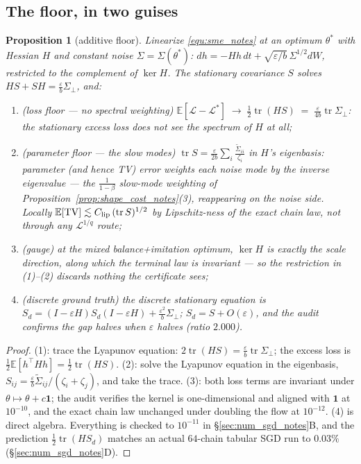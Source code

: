 \documentclass[11pt]{article}
\newtheorem{proposition}[theorem]{Proposition}
\theoremstyle{definition}
\theoremstyle{remark}
\begin{document}
\subsection{The floor, in two guises}\label{sec:floor_notes}

\begin{proposition}[additive floor]\label{prop:additive_floor_notes}
Linearize \eqref{equ:sme_notes} at an optimum $\theta^*$ with Hessian $H$ and constant noise
$\Sigma = \Sigma(\theta^*)$: $dh = -Hh\,dt + \sqrt{\varepsilon/b}\,\Sigma^{1/2}dW$,
restricted to the complement of $\ker H$. The stationary covariance $S$ solves
$HS+SH = \tfrac{\varepsilon}{b}\Sigma_\perp$, and:
\begin{enumerate}
    \item \emph{(loss floor --- no spectral weighting)}\;
    $\mathbb E[\mathcal L-\mathcal L^*] \;\to\; \tfrac12\operatorname{tr}(HS)
    \;=\; \frac{\varepsilon}{4b}\operatorname{tr}\Sigma_\perp$: the stationary excess
    loss does not see the spectrum of $H$ at all;
    \item \emph{(parameter floor --- the slow modes)}\;
    $\operatorname{tr} S = \frac{\varepsilon}{2b}\sum_i
    \frac{\widetilde\Sigma_{ii}}{\zeta_i}$ in $H$'s eigenbasis: parameter (and hence
    TV) error weights each noise mode by the \emph{inverse} eigenvalue --- the
    $\frac1{1-\beta}$ slow-mode weighting of Proposition~\ref{prop:shape_cost_notes}(3),
    reappearing on the noise side. Locally
    $\mathbb E[\mathrm{TV}] \lesssim C_{\mathrm{lip}}\,(\operatorname{tr}S)^{1/2}$ by
    Lipschitz-ness of the exact chain law, not through any $\mathcal L^{1/q}$ route;
    \item \emph{(gauge)} at the mixed balance+imitation optimum, $\ker H$ is exactly the
    scale direction, along which the terminal law is invariant --- so the restriction
    in (1)--(2) discards nothing the certificate sees;
    \item \emph{(discrete ground truth)} the discrete stationary equation is
    $S_d = (I-\varepsilon H)S_d(I-\varepsilon H) + \tfrac{\varepsilon^2}b\Sigma_\perp$;
    $S_d = S + O(\varepsilon)$, and the audit confirms the gap halves when
    $\varepsilon$ halves (ratio $2.000$).
\end{enumerate}
\end{proposition}

\begin{proof}
(1): trace the Lyapunov equation: $2\operatorname{tr}(HS) =
\tfrac{\varepsilon}b\operatorname{tr}\Sigma_\perp$; the excess loss is
$\tfrac12\mathbb E[h^\top Hh] = \tfrac12\operatorname{tr}(HS)$. (2): solve the Lyapunov
equation in the eigenbasis, $S_{ij} = \tfrac{\varepsilon}b
\widetilde\Sigma_{ij}/(\zeta_i+\zeta_j)$, and take the trace. (3): both loss terms
are invariant under $\theta\mapsto\theta+c\mathbf 1$; the audit verifies the kernel is
one-dimensional and aligned with $\mathbf 1$ at $10^{-10}$, and the exact chain law
unchanged under doubling the flow at $10^{-12}$. (4) is direct algebra. Everything is
checked to $10^{-11}$ in \S\ref{sec:num_sgd_notes}B, and the prediction
$\tfrac12\operatorname{tr}(HS_d)$ matches an actual $64$-chain tabular SGD run to
$0.03\%$ (\S\ref{sec:num_sgd_notes}D).
\end{proof}
\end{document}
